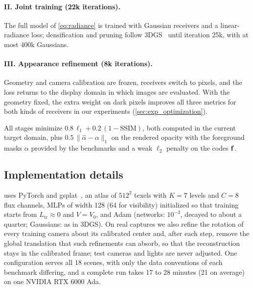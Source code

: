 \paragraph{II. Joint training (22k iterations).}
The full model of \cref{eq:radiance} is trained with Gaussian receivers and a linear-radiance loss; densification and pruning follow 3DGS~\cite{kerbl20233d} until iteration 25k, with at most 400k Gaussians.

\paragraph{III. Appearance refinement (8k iterations).}
Geometry and camera calibration are frozen, receivers switch to pixels, and the loss returns to the display domain in which images are evaluated.
With the geometry fixed, the extra weight on dark pixels improves all three metrics for both kinds of receivers in our experiments (\cref{sec:exp_optimization}).

All stages minimize $0.8\,\ell_1+0.2\,(1-\mathrm{SSIM})$, both computed in the current target domain, plus $0.5\,\|\hat\alpha-\alpha\|_1$ on the rendered opacity with the foreground masks $\alpha$ provided by the benchmarks and a weak $\ell_2$ penalty on the codes $\mathbf{f}$.

\subsection{Implementation details}
\label{sec:implementation}
\ours uses PyTorch and gsplat~\cite{ye2025gsplat}, an atlas of $512^2$ texels with $K=7$ levels and $C=8$ flux channels, MLPs of width 128 (64 for visibility) initialized so that training starts from $L_{\mathrm{tr}}\approx 0$ and $V=V_0$, and Adam (networks: $10^{-3}$, decayed to about a quarter; Gaussians: as in 3DGS).
On real captures we also refine the rotation of every training camera about its calibrated center and, after each step, remove the global translation that such refinements can absorb, so that the reconstruction stays in the calibrated frame; test cameras and lights are never adjusted.
One configuration serves all 18 scenes, with only the data conventions of each benchmark differing, and a complete run takes 17 to 28 minutes (21 on average) on one NVIDIA RTX 6000 Ada.

